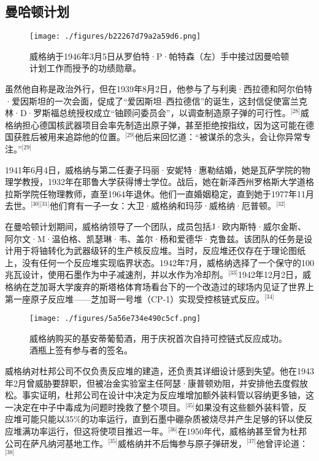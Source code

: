 \subsection{曼哈顿计划}
\begin{figure}[ht]
\centering
\texttt{[image: ./figures/b22267d79a2a59d6.png]}
\caption{威格纳于1946年3月5日从罗伯特·P·帕特森（左）手中接过因曼哈顿计划工作而授予的功绩勋章。} \label{fig_YJwgn_4}
\end{figure}
虽然他自称是政治外行，但在1939年8月2日，他参与了与利奥·西拉德和阿尔伯特·爱因斯坦的一次会面，促成了“爱因斯坦–西拉德信”的诞生，这封信促使富兰克林·D·罗斯福总统授权成立“铀顾问委员会”，以调查制造原子弹的可行性。\(^\text{[28]}\)威格纳担心德国核武器项目会率先制造出原子弹，甚至拒绝按指纹，因为这可能在德国获胜后被用来追踪他的位置。\(^\text{[29]}\)他后来回忆道：“被谋杀的念头，会让你异常专注。”\(^\text{[29]}\)

1941年6月4日，威格纳与第二任妻子玛丽·安妮特·惠勒结婚，她是瓦萨学院的物理学教授，1932年在耶鲁大学获得博士学位。战后，她在新泽西州罗格斯大学道格拉斯学院任物理教师，直至1964年退休。他们一直婚姻稳定，直到她于1977年11月去世。\(^\text{[30][31]}\)他们育有一子一女：大卫·威格纳和玛莎·威格纳·厄普顿。\(^\text{[32]}\)

在曼哈顿计划期间，威格纳领导了一个团队，成员包括J·欧内斯特·威尔金斯、阿尔文·M·温伯格、凯瑟琳·韦、盖尔·杨和爱德华·克鲁兹。该团队的任务是设计用于将铀转化为武器级钚的生产核反应堆。当时，反应堆还仅存在于理论图纸上，没有任何一个反应堆实现临界状态。1942年7月，威格纳选择了一个保守的100兆瓦设计，使用石墨作为中子减速剂，并以水作为冷却剂。\(^\text{[33]}\)1942年12月2日，威格纳在芝加哥大学废弃的斯塔格体育场看台下的一个改造过的球场内见证了世界上第一座原子反应堆——芝加哥一号堆（CP-1）实现受控核链式反应。\(^\text{[34]}\)
\begin{figure}[ht]
\centering
\texttt{[image: ./figures/5a56e734e490c5cf.png]}
\caption{威格纳购买的基安蒂葡萄酒，用于庆祝首次自持可控链式反应成功。酒瓶上签有参与者的签名。} \label{fig_YJwgn_5}
\end{figure}
威格纳对杜邦公司不仅负责反应堆的建造，还负责其详细设计感到失望。他在1943年2月曾威胁要辞职，但被冶金实验室主任阿瑟·康普顿劝阻，并安排他去度假放松。事实证明，杜邦公司在设计中决定为反应堆增加额外装料管以容纳更多铀，这一决定在中子中毒成为问题时挽救了整个项目。\(^\text{[35]}\)如果没有这些额外装料管，反应堆可能只能以35\%的功率运行，直到石墨中硼杂质被烧尽并产生足够的钚以使反应堆满功率运行，但这将使项目推迟一年。\(^\text{[36]}\)在1950年代，威格纳甚至曾为杜邦公司在萨凡纳河基地工作。\(^\text{[35]}\)威格纳并不后悔参与原子弹研发，\(^\text{[37]}\)他曾评论道：\(^\text{[38]}\)


